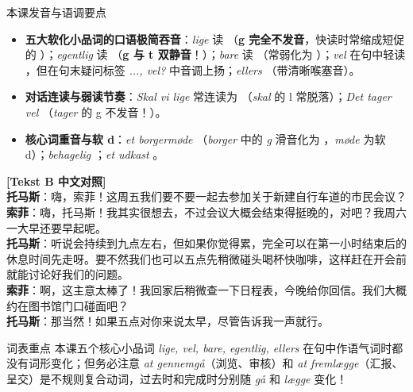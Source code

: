 \begin{tipbox}{本课发音与语调要点}
\begin{itemize}
  \item \textbf{五大软化小品词的口语极简吞音}：\textit{lige} 读 （\textbf{g 完全不发音}，快读时常缩成短促的 ）；\textit{egentlig} 读 （\textbf{g 与 t 双静音}！）；\textit{bare} 读 （常弱化为 ）；\textit{vel} 在句中轻读 ，但在句末疑问标签 \textit{..., vel?} 中音调上扬；\textit{ellers} （带清晰喉塞音）。
  \item \textbf{对话连读与弱读节奏}：\textit{Skal vi lige} 常连读为 （\textit{skal} 的 l 常脱落）；\textit{Det tager vel} （\textit{tager} 的 g 不发音！）。
  \item \textbf{核心词重音与软 d}：\textit{et borgermøde} （\textit{borger} 中的 \textit{g} 滑音化为 ，\textit{møde} 为软 d）；\textit{behagelig} ；\textit{et udkast} 。
\end{itemize}
\end{tipbox}

\begin{transbox}
\small
\textbf{\color{NCDTeal}[Tekst B 中文对照]}\\
\textbf{托马斯}：嗨，索菲！这周五我们要不要一起去参加关于新建自行车道的市民会议？\\
\textbf{索菲}：嗨，托马斯！我其实很想去，不过会议大概会结束得挺晚的，对吧？我周六一大早还要早起呢。\\
\textbf{托马斯}：听说会持续到九点左右，但如果你觉得累，完全可以在第一小时结束后的休息时间先走呀。要不然我们也可以五点先稍微碰头喝杯快咖啡，这样赶在开会前就能讨论好我们的问题。\\
\textbf{索菲}：啊，这主意太棒了！我回家后稍微查一下日程表，今晚给你回信。我们大概约在图书馆门口碰面吧？\\
\textbf{托马斯}：那当然！如果五点对你来说太早，尽管告诉我一声就行。
\end{transbox}


\begin{tipbox}{词表重点}
本课五个核心小品词 \textit{lige, vel, bare, egentlig, ellers} 在句中作语气词时都没有词形变化；但务必注意 \textit{at gennemgå}（浏览、审核）和 \textit{at fremlægge}（汇报、呈交）是不规则复合动词，过去时和完成时分别随 \textit{gå} 和 \textit{lægge} 变化！
\end{tipbox}

